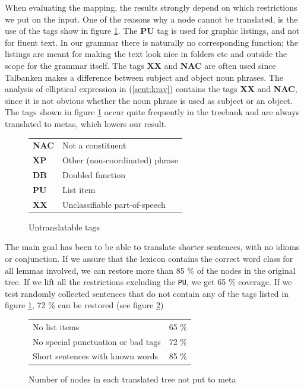 \documentclass[10pt, a4paper]{article}
\begin{document}
When evaluating the mapping, the results strongly depend on which restrictions we
put on the input. 
One of the reasons why a node cannot be translated, is the 
use of the tags show in figure \ref{fig:mapBadtag}.
The \textbf{PU} tag is used for graphic listings, and not for fluent text.
In our grammar there is naturally no corresponding function; 
the listings are meant for making the text look nice in
folders etc and outside the scope for the grammar itself. The tags \textbf{XX}
and \textbf{NAC} are often used since Talbanken makes a
difference between subject
and object noun phrases.
The analysis of elliptical expression in (\ref{sent:krav})
\label{sent:krav}
contains the tags \textbf{XX} and \textbf{NAC}, since it is not obvious
whether the noun phrase is used as subject or an object.
The tags shown in figure \ref{fig:mapBadtag} occur quite frequently in the treebank and are always translated
to metas, which lowers our result. \\
\begin{figure}[h]
\begin{tabular}{ll}
\textbf{NAC} & Not a constituent\\
\textbf{XP} & Other (non-coordinated) phrase\\
\textbf{DB} & Doubled function\\
\textbf{PU} & List item\\
\textbf{XX} & Unclassifiable part-of-speech\\
\end{tabular}
\caption{Untranslatable tags}\label{fig:mapBadtag}
\end{figure}


The main goal has been to be able to translate shorter sentences, with no
idioms or conjunction.
If we assure that the lexicon contains the correct word class for all lemmas
involved, we
can restore more than 85 \% of the nodes in the original tree.
If we lift all the restrictions excluding the \verb|PU|, we get
65 \% coverage. 
If we test randomly collected sentences that do not contain any of the tags listed
in figure \ref{fig:mapBadtag}, 72 \% can be restored (see figure \ref{tab:mappres})

\begin{figure}[h]
\begin{tabular}{|ll|}
\hline
No list items & 65 \%\\
No special punctuation or bad tags& 72 \%\\
Short sentences with known words & 85 \%\\
\hline
\end{tabular}
\caption{Number of nodes in each translated tree not put to meta}
\label{tab:mappres}
\end{figure}
\end{document}

